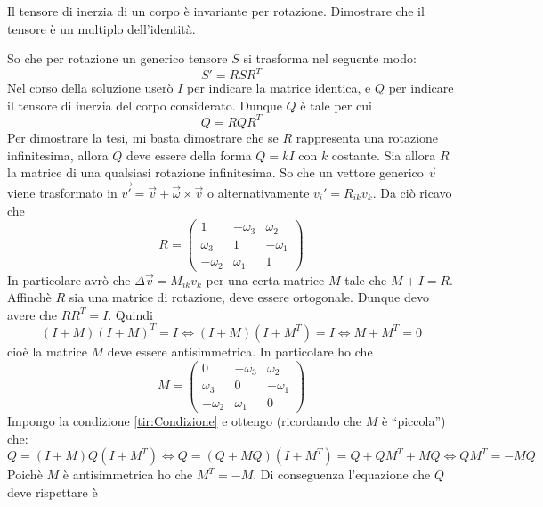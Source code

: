 \documentclass[../main.tex]{subfiles}
\begin{document}

\textex
Il tensore di inerzia di un corpo è invariante per rotazione. Dimostrare che il tensore è un multiplo dell'identità.

\solution
So che per rotazione un generico tensore $S$ si trasforma nel seguente modo: 
\begin{equation}
 S' = RSR^T
\end{equation}
Nel corso della soluzione userò $I$ per indicare la matrice identica, e $Q$ per indicare il tensore di inerzia del corpo considerato.
Dunque $Q$ è tale per cui
\begin{equation}\label{tir:Condizione}
 Q = RQR^T
\end{equation}
Per dimostrare la tesi, mi basta dimostrare che se $R$ rappresenta una rotazione infinitesima, allora $Q$ deve essere della forma $Q=kI$ con $k$ costante.
Sia allora $R$ la matrice di una qualsiasi rotazione infinitesima. So che un vettore generico $\overrightarrow v$ viene trasformato in 
$ \overrightarrow{v'} = \overrightarrow v + \overrightarrow\omega \times \overrightarrow v $ o alternativamente  ${v_i}' = R_{ik}v_k$. Da ciò ricavo che
$$ R =
\begin{pmatrix}
 1 & -\omega_3 & \omega_2 \\
 \omega_3 & 1 & -\omega_1 \\
 -\omega_2 & \omega_1 & 1
\end{pmatrix}
$$
In particolare avrò che $\Delta \overrightarrow v = M_{ik}v_k$ per una certa matrice $M$ tale che $M+I=R$.
Affinchè $R$ sia una matrice di rotazione, deve essere ortogonale. Dunque devo avere che $RR^T=I$. Quindi
\begin{equation}
 (I+M)(I+M)^T = I \Leftrightarrow (I+M)(I+M^T)=I \Leftrightarrow M+M^T = 0
\end{equation}
cioè la matrice $M$ deve essere antisimmetrica. In particolare ho che 
$$ M =
\begin{pmatrix}
 0 & -\omega_3 & \omega_2 \\
 \omega_3 & 0 & -\omega_1 \\
 -\omega_2 & \omega_1 & 0
\end{pmatrix}
$$
Impongo la condizione \cref{tir:Condizione} e ottengo (ricordando che $M$ è ``piccola'') che:
\begin{equation}
  Q=(I+M)Q(I+M^T) \Leftrightarrow Q=(Q+MQ)(I+M^T)=Q+QM^T+MQ\Leftrightarrow QM^T=-MQ
\end{equation}
Poichè $M$ è antisimmetrica ho che $M^T=-M$. Di conseguenza l'equazione che $Q$ deve rispettare è 
\end{document}

